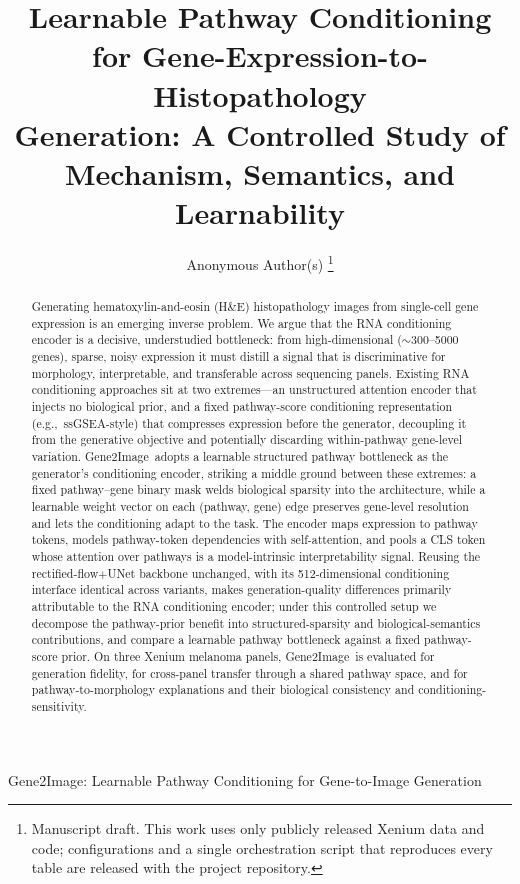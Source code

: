 \documentclass[journal]{IEEEtran}
\newcommand{\method}{Gene2Image}
\newcommand{\eg}{e.g.,}
\begin{document}
\title{Learnable Pathway Conditioning for Gene-Expression-to-Histopathology\\ Generation: A Controlled Study of Mechanism, Semantics, and Learnability}

\author{Anonymous Author(s)%
\thanks{Manuscript draft. This work uses only publicly released Xenium data and
code; configurations and a single orchestration script that reproduces every
table are released with the project repository.}}

%
{\method: Learnable Pathway Conditioning for Gene-to-Image Generation}

\maketitle

\begin{abstract}
Generating hematoxylin-and-eosin (H\&E) histopathology images from single-cell
gene expression is an emerging inverse problem. We
argue that the RNA conditioning encoder is a decisive, understudied bottleneck:
from high-dimensional ($\sim$300--5000 genes), sparse, noisy
expression it must distill a signal that is discriminative for morphology,
interpretable, and transferable across sequencing panels. Existing RNA conditioning approaches sit
at two extremes---an unstructured attention encoder that injects no biological
prior, and a fixed pathway-score conditioning representation (\eg\ ssGSEA-style)
that compresses expression before the generator, decoupling it from the
generative objective and potentially discarding within-pathway gene-level variation. \method\ adopts a learnable structured pathway bottleneck as the generator's
conditioning encoder, striking a middle ground between these extremes: a fixed pathway--gene binary mask welds
biological sparsity into the architecture, while a learnable weight vector on each
(pathway, gene) edge preserves gene-level resolution and lets the conditioning
adapt to the task. The encoder maps expression to pathway tokens, models pathway-token
dependencies with self-attention, and pools a CLS token whose attention
over pathways is a model-intrinsic interpretability signal. Reusing the
rectified-flow$+$UNet backbone unchanged, with its 512-dimensional conditioning
interface identical across variants, makes generation-quality differences
primarily attributable to the RNA conditioning encoder; under this controlled setup we decompose the pathway-prior benefit into
structured-sparsity and biological-semantics contributions, and compare a
learnable pathway bottleneck against a fixed pathway-score prior. On three Xenium
melanoma panels, \method\ is evaluated for generation fidelity, for cross-panel
transfer through a shared pathway space, and for pathway-to-morphology
explanations and their biological consistency and conditioning-sensitivity.
\end{abstract}
\end{document}
